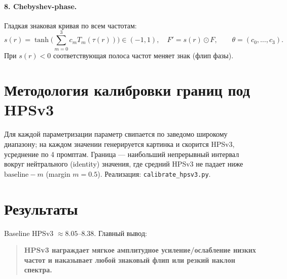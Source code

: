 \documentclass[11pt,a4paper]{article}
\begin{document}
\paragraph{8. Chebyshev-phase.} Гладкая знаковая кривая по всем частотам:
\begin{equation}
s(r) = \tanh\!\Big(\sum_{m=0}^{3} c_m T_m(\tau(r))\Big) \in (-1, 1),
\quad F' = s(r)\odot F, \qquad \theta = (c_0,\dots,c_3).
\end{equation}
При $s(r) < 0$ соответствующая полоса частот меняет знак (флип фазы).

\section{Методология калибровки границ под HPSv3}

Для каждой параметризации параметр свипается по заведомо широкому диапазону;
на каждом значении генерируется картинка и скорится HPSv3, усреднение по
4 промптам. Граница — наибольший непрерывный интервал вокруг нейтрального
(identity) значения, где средний HPSv3 не падает ниже $\text{baseline} - m$
(margin $m = 0.5$). Реализация: \texttt{calibrate\_hpsv3.py}.

\section{Результаты}

Baseline HPSv3 $\approx 8.05$--$8.38$. Главный вывод:
\begin{quote}
\textbf{HPSv3 награждает мягкое амплитудное усиление/ослабление низких частот и
наказывает любой знаковый флип или резкий наклон спектра.}
\end{quote}
\end{document}
